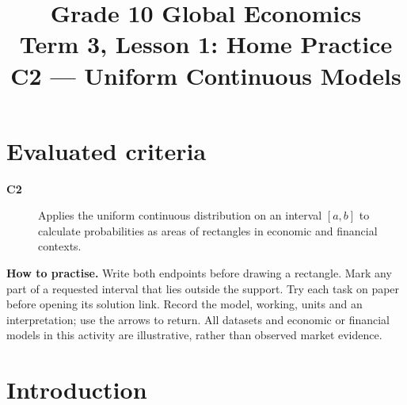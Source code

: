 \makeatletter
{}
\makeatother




\newcommand{\PracticeDensity}[9]{\begingroup\colorlet{blue}{black}\CompactDensityCoordinatesGraph{#1}{#2}{#3}{#4}{#5}{#6}{#7}{#8}{#9}\endgroup}

\title{Grade 10 Global Economics\\Term 3, Lesson 1: Home Practice\\C2 --- Uniform Continuous Models}
\author{}
\date{}

\maketitle
\setcounter{tocdepth}{1}
\setcounter{secnumdepth}{2}
\label{toc}
\tableofcontents
\section*{Evaluated criteria}
\begin{description}
\item[\textbf{C2}] Applies the uniform continuous distribution on an interval \([a,b]\) to calculate probabilities as areas of rectangles in economic and financial contexts.
\end{description}
\textbf{How to practise.} Write both endpoints before drawing a rectangle. Mark any part of a requested interval that lies outside the support. Try each task on paper before opening its solution link. Record the model, working, units and an interpretation; use the arrows to return.
All datasets and economic or financial models in this activity are illustrative, rather than observed market evidence.

\clearpage
\section{Introduction}\label{sec:introduction}
